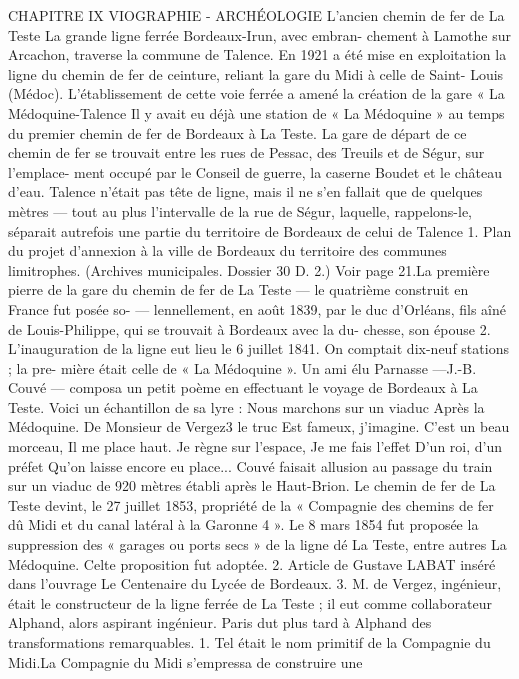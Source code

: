 \documentclass[a4paper,11pt]{book}
\begin{document}
CHAPITRE IX
VIOGRAPHIE - ARCHÉOLOGIE
L'ancien chemin de fer de La Teste
La grande ligne ferrée Bordeaux-Irun, avec embran-
chement à Lamothe sur Arcachon, traverse la commune
de Talence.
En 1921 a été mise en exploitation la ligne du chemin
de fer de ceinture, reliant la gare du Midi à celle de Saint-
Louis (Médoc). L'établissement de cette voie ferrée a amené
la création de la gare « La Médoquine-Talence
Il y avait eu déjà une station de « La Médoquine » au
temps du premier chemin de fer de Bordeaux à La Teste.
La gare de départ de ce chemin de fer se trouvait entre
les rues de Pessac, des Treuils et de Ségur, sur l'emplace-
ment occupé par le Conseil de guerre, la caserne Boudet
et le château d'eau.
Talence n'était pas tête de ligne, mais il ne s'en fallait
que de quelques mètres — tout au plus l'intervalle de la
rue de Ségur, laquelle, rappelons-le, séparait autrefois
une partie du territoire de Bordeaux de celui de Talence
1. Plan du projet d'annexion à la ville de Bordeaux du territoire des
communes limitrophes. (Archives municipales. Dossier 30 D. 2.) Voir
page 21.La première pierre de la gare du chemin de fer de La
Teste — le quatrième construit en France
fut
posée so-
—
lennellement, en août 1839, par le duc d'Orléans, fils aîné de
Louis-Philippe, qui se trouvait à Bordeaux avec la du-
chesse, son épouse 2. L'inauguration de la ligne eut lieu
le 6 juillet 1841. On comptait dix-neuf stations ; la pre-
mière était celle de « La Médoquine ».
Un ami élu Parnasse —J.-B. Couvé — composa un petit
poème en effectuant le voyage de Bordeaux à La Teste.
Voici un échantillon de sa lyre :
Nous marchons sur un viaduc
Après la Médoquine.
De Monsieur de Vergez3 le truc
Est fameux, j'imagine.
C'est un beau morceau,
Il me place haut.
Je règne sur l'espace,
Je me fais l'effet
D'un roi, d'un préfet
Qu'on laisse encore eu place...
Couvé faisait allusion au passage du train sur un viaduc
de 920 mètres établi après le Haut-Brion.
Le chemin de fer de La Teste devint, le 27 juillet 1853,
propriété de la « Compagnie des chemins de fer dû Midi
et du canal latéral à la Garonne 4 ». Le 8 mars 1854 fut
proposée la suppression des « garages ou ports secs » de
la ligne dé La Teste, entre autres La Médoquine. Celte
proposition fut adoptée.
2. Article de Gustave LABAT inséré dans l'ouvrage Le Centenaire du
Lycée de Bordeaux.
3. M. de Vergez, ingénieur, était le constructeur de la ligne ferrée de
La Teste ; il eut comme collaborateur Alphand, alors aspirant ingénieur.
Paris dut plus tard à Alphand des transformations remarquables.
1. Tel était le nom primitif de la Compagnie du Midi.La Compagnie du Midi s'empressa de construire une
\end{document}
